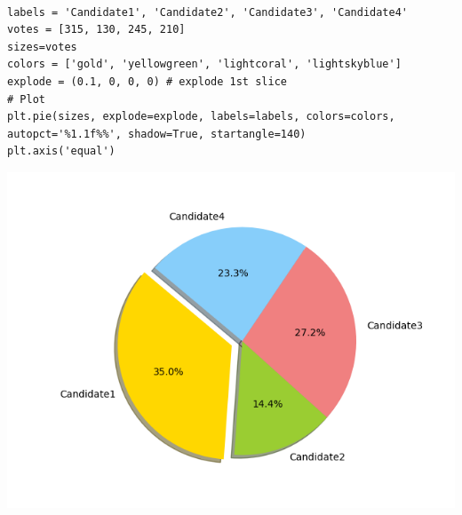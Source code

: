 \documentclass[11pt]{article}
\begin{document}
\newpage
\begin{verbatim}

labels = 'Candidate1', 'Candidate2', 'Candidate3', 'Candidate4'
votes = [315, 130, 245, 210]
sizes=votes
colors = ['gold', 'yellowgreen', 'lightcoral', 'lightskyblue']
explode = (0.1, 0, 0, 0) # explode 1st slice
# Plot
plt.pie(sizes, explode=explode, labels=labels, colors=colors,
autopct='%1.1f%%', shadow=True, startangle=140)
plt.axis('equal')

\end{verbatim}

\begin{center}
\includegraphics[width=.9\linewidth]{fig16.png}
\end{center}

\newpage
\end{document}
